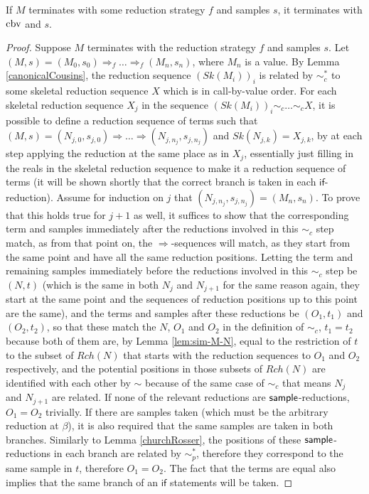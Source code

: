 \begin{theorem} \label{thm:CbvIsTerminatingest}
If $M$ terminates with some reduction strategy $f$ and samples $s$, it terminates with $\operatorname{cbv}$ and $s$.
\end{theorem}
\begin{proof}
  Suppose $M$ terminates with the reduction strategy $f$ and samples $s$. Let $(M,s) = (M_0,s_0) \Rightarrow_f \dots \Rightarrow_f (M_n,s_n)$, where $M_n$ is a value. By Lemma \ref{canonicalCousins}, the reduction sequence $(Sk(M_i))_i$ is related by $\sim_c^*$ to some skeletal reduction sequence $X$ which is in call-by-value order. For each skeletal reduction sequence $X_j$ in the sequence $(Sk(M_i))_i \sim_c \dots \sim_c X$, it is possible to define a reduction sequence of terms such that $(M,s) = (N_{j,0},s_{j,0}) \Rightarrow \dots \Rightarrow (N_{j,n_j},s_{j,n_j})$ and $Sk(N_{j,k}) = X_{j,k}$, by at each step applying the reduction at the same place as in $X_j$, essentially just filling in the reals in the skeletal reduction sequence to make it a reduction sequence of terms (it will be shown shortly that the correct branch is taken in each $\textsf{if}$-reduction). Assume for induction on $j$ that $(N_{j,n_j},s_{j,n_j}) = (M_n,s_n)$. To prove that this holds true for $j+1$ as well, it suffices to show that the corresponding term and samples immediately after the reductions involved in this $\sim_c$ step match, as from that point on, the $\Rightarrow$-sequences will match, as they start from the same point and have all the same reduction positions. Letting the term and remaining samples immediately before the reductions involved in this $\sim_c$ step be $(N,t)$ (which is the same in both $N_j$ and $N_{j+1}$ for the same reason again, they start at the same point and the sequences of reduction positions up to this point are the same), and the terms and samples after these reductions be $(O_1,t_1)$ and $(O_2,t_2)$, so that these match the $N$, $O_1$ and $O_2$ in the definition of $\sim_c$, $t_1 = t_2$ because both of them are, by Lemma \ref{lem:sim-M-N}, equal to the restriction of $t$ to the subset of $Rch(N)$ that starts with the reduction sequences to $O_1$ and $O_2$ respectively, and the potential positions in those subsets of $Rch(N)$ are identified with each other by $\sim$ because of the same case of $\sim_c$ that means $N_j$ and $N_{j+1}$ are related. If none of the relevant reductions are $\mathsf{sample}$-reductions, $O_1 = O_2$ trivially. If there are samples taken (which must be the arbitrary reduction at $\beta$), it is also required that the same samples are taken in both branches. Similarly to Lemma \ref{churchRosser}, the positions of these $\mathsf{sample}$-reductions in each branch are related by $\sim_p^*$, therefore they correspond to the same sample in $t$, therefore $O_1 = O_2$. The fact that the terms are equal also implies that the same branch of an $\textsf{if}$ statements will be taken.


\end{proof}
